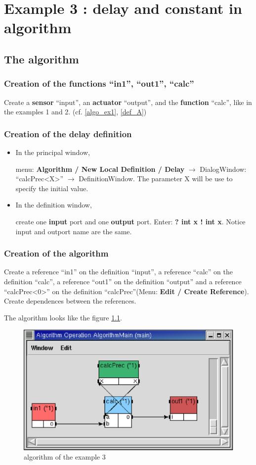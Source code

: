 \documentclass[a4paper,twoside]{report}
\begin{document}
\chapter{Example 3 : delay and constant in algorithm}
\section{The algorithm}
\subsection{Creation of the functions ``in1'', ``out1'', ``calc''}

Create a \textbf{sensor} ``input'', an \textbf{actuator} ``output'', and the
\textbf{function} ``calc'', like in the
examples 1 and 2. (cf. \ref{algo_ex1}, \ref{def_A})

\subsection{Creation of the delay definition}
\begin{itemize}
\item In the principal window, 

menu: \textbf{Algorithm / New Local Definition / Delay} $\rightarrow$
DialogWindow: ``calcPrec<X>'' $\rightarrow$ DefinitionWindow. The parameter X
will be use to specify the initial value. 

\item In the definition window,

create one \textbf{input} port and one \textbf{output} port. Enter: \textbf{?
  int x !  int x}. Notice input and outport name are the same.


\end{itemize}

\subsection{Creation of the algorithm}
Create a reference ``in1'' on the definition ``input'', a reference ``calc'' on
the definition ``calc'', a reference ``out1'' on the definition ``output'' and
a reference ``calcPrec<0>'' on the definition ``calcPrec''(Menu: \textbf{Edit /
Create Reference}). Create dependences between the references.

The algorithm looks like the figure \ref{algo3}.

\begin{figure}[htbp]
  \begin{center} 
        \includegraphics[width=0.57\linewidth]{algorithm_ex3.eps} 
  \end{center}
  \caption{algorithm of the example 3}
  \label{algo3}
\end{figure}
\end{document}
